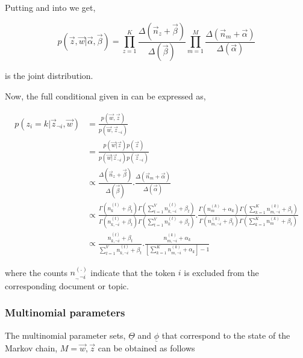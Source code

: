 Putting  and  into  we get,

\begin{equation}\label{eqn:jointdistribution}
p(\vec{z},\vec{w}|\vec{\alpha},\vec{\beta}) = \prod_{z=1}^{K} \frac{\Delta(\vec{n}_z+\vec{\beta})}{\Delta(\vec{\beta})} \prod_{m=1}^{M} \frac{\Delta(\vec{n}_m+\vec{\alpha})}{\Delta(\vec{\alpha})}
\end{equation}

 is the joint distribution. 

Now, the full conditional given in  can be expressed as,
 
\begin{align}
p(z_i=k|\vec{z}_{\neg i},\vec{w})	& = \frac{p(\vec{w},\vec{z})}{p(\vec{w},\vec{z}_{\neg i})} \\
					& = \frac{p(\vec{w}|\vec{z})p(\vec{z})}{p(\vec{w}|\vec{z}_{\neg i})p(\vec{z}_{\neg i})} \\
					& \propto \frac{\Delta(\vec{n}_z+\vec{\beta})}{\Delta(\vec{\beta})} . \frac{\Delta(\vec{n}_m+\vec{\alpha})}{\Delta(\vec{\alpha})} \\
					& \propto \frac{\Gamma(n_{k}^{(t)} + \beta_t)\Gamma(\sum_{t=1}^{V} n_{k,\neg i}^{(t)} + \beta_t)}{\Gamma(n_{k,\neg i}^{(t)} + \beta_t)\Gamma(\sum_{t=1}^{V} n_{k}^{(t)} + \beta_t)}.
						  \frac{\Gamma(n_{m}^{(k)} + \alpha_k)\Gamma(\sum_{k=1}^{K} n_{m,\neg i}^{(k)} + \beta_t)}{\Gamma(n_{m,\neg i}^{(k)} + \beta_t)\Gamma(\sum_{k=1}^{K} n_{m}^{(k)} + \beta_t)} \\
					& \propto \frac{n_{k,\neg i}^{(t)} + \beta_t}{\sum_{t=1}^{V}n_{k,\neg i}^{(t)} + \beta_t}.
						  \frac{n_{m,\neg i}^{(k)} + \alpha_k}{[\sum_{k=1}^{K}n_{m,\neg i}^{(k)} + \alpha_k]-1}
					\label{eqn:fullconditionalfinal}
\end{align}

where the counts \(n_{.,\neg i}^{(.)}\) indicate that the token \(i\) is excluded from the corresponding document or topic.

\subsubsection*{Multinomial parameters}

The multinomial parameter sets, \(\underline{\Theta}\) and \(\underline{\phi}\) that correspond to the state of the Markov
chain, \(M={\vec{w},\vec{z}}\) can be obtained as follows

